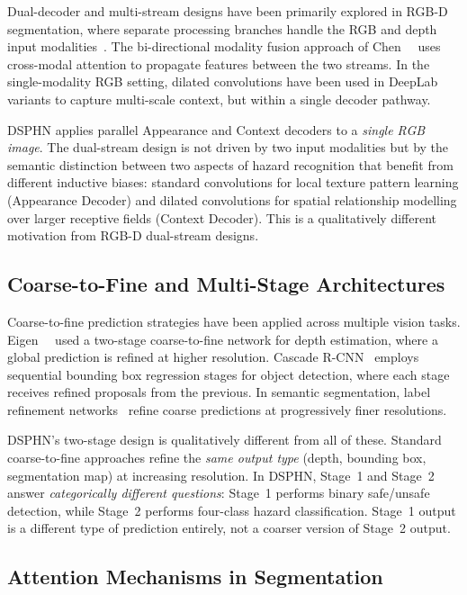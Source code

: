 Dual-decoder and multi-stream designs have been primarily explored
in RGB-D segmentation, where separate processing branches handle
the RGB and depth input modalities~\cite{chen2020bi}. The
bi-directional modality fusion approach of Chen~\etal~\cite{chen2020bi}
uses cross-modal attention to propagate features between the two
streams. In the single-modality RGB setting, dilated convolutions
have been used in DeepLab variants to capture multi-scale context,
but within a single decoder pathway.

DSPHN applies parallel Appearance and Context decoders to a
\textit{single RGB image}. The dual-stream design is not driven
by two input modalities but by the semantic distinction between
two aspects of hazard recognition that benefit from different
inductive biases: standard convolutions for local texture pattern
learning (Appearance Decoder) and dilated convolutions for
spatial relationship modelling over larger receptive fields
(Context Decoder). This is a qualitatively different motivation
from RGB-D dual-stream designs.

\subsection{Coarse-to-Fine and Multi-Stage Architectures}

Coarse-to-fine prediction strategies have been applied across
multiple vision tasks. Eigen~\etal~\cite{eigen2014depth} used
a two-stage coarse-to-fine network for depth estimation, where a
global prediction is refined at higher resolution. Cascade
R-CNN~\cite{cai2018cascade} employs sequential bounding box
regression stages for object detection, where each stage receives
refined proposals from the previous. In semantic segmentation,
label refinement networks~\cite{islam2017label} refine
coarse predictions at progressively finer resolutions.

DSPHN's two-stage design is qualitatively different from all of
these. Standard coarse-to-fine approaches refine the \textit{same
output type} (depth, bounding box, segmentation map) at increasing
resolution. In DSPHN, Stage~1 and Stage~2 answer
\textit{categorically different questions}: Stage~1 performs binary
safe/unsafe detection, while Stage~2 performs four-class hazard
classification. Stage~1 output is a different type of prediction
entirely, not a coarser version of Stage~2 output.

\subsection{Attention Mechanisms in Segmentation}

